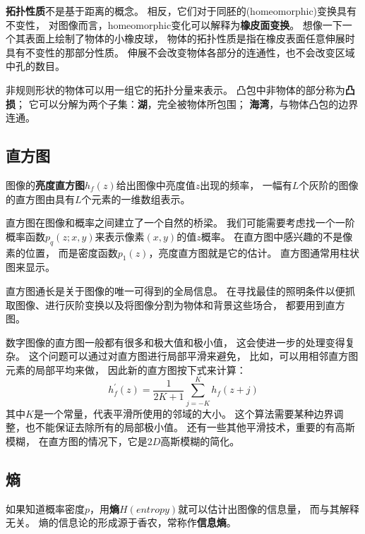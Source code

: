 \textbf{\color{magenta}拓扑性质}不是基于距离的概念。%
相反，它们对于同胚的(homeomorphic)变换具有不变性，%
对图像而言，homeomorphic变化可以解释为\textbf{\color{magenta}橡皮面变换}。%
想像一下一个其表面上绘制了物体的小橡皮球，%
物体的拓扑性质是指在橡皮表面任意伸展时具有不变性的那部分性质。%
伸展不会改变物体各部分的连通性，也不会改变区域中孔的数目。

非规则形状的物体可以用一组它的拓扑分量来表示。%
凸包中非物体的部分称为\textbf{\color{magenta}凸损}；%
它可以分解为两个子集：\textbf{\color{magenta}湖}，完全被物体所包围；%
\textbf{\color{magenta}海湾}，与物体凸包的边界连通。

\subsection{直方图}
图像的\textbf{\color{magenta}亮度直方图}$h_{f}(z)$给出图像中亮度值$z$出现的频率，%
一幅有$L$个灰阶的图像的直方图由具有$L$个元素的一维数组表示。


直方图在图像和概率之间建立了一个自然的桥梁。%
我们可能需要考虑找一个一阶概率函数$p_{q}(z;x,y)$来表示像素$(x,y)$的值$z$概率。%
在直方图中感兴趣的不是像素的位置，%
而是密度函数$p_{1}(z)$，亮度直方图就是它的估计。%
直方图通常用柱状图来显示。%

直方图通长是关于图像的唯一可得到的全局信息。%
在寻找最佳的照明条件以便抓取图像、进行灰阶变换以及将图像分割为物体和背景这些场合，%
都要用到直方图。

数字图像的直方图一般都有很多和极大值和极小值，%
这会使进一步的处理变得复杂。%
这个问题可以通过对直方图进行局部平滑来避免，%
比如，可以用相邻直方图元素的局部平均来做，%
因此新的直方图按下式来计算：
\begin{equation}
  h_{f}^{'}(z) = \frac{1}{2K+1}\sum_{j=-K}^{K}h_{f}(z+j)
\end{equation}
其中$K$是一个常量，代表平滑所使用的邻域的大小。
这个算法需要某种边界调整，也不能保证去除所有的局部极小值。%
还有一些其他平滑技术，重要的有高斯模糊，%
在直方图的情况下，它是$2D$高斯模糊的简化。

\subsection{熵}
如果知道概率密度$p$，用\textbf{\color{magenta}熵$H(entropy)$}就可以估计出图像的信息量，%
而与其解释无关。%
熵的信息论的形成源于香农，常称作\textbf{\color{magenta}信息熵}。%


